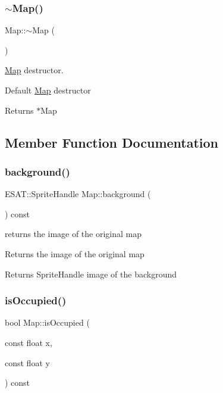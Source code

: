 \subsubsection{\texorpdfstring{$\sim$\+Map()}{~Map()}}
{\footnotesize\ttfamily Map\+::$\sim$\+Map (\begin{DoxyParamCaption}{ }\end{DoxyParamCaption})}



\mbox{\hyperlink{class_map}{Map}} destructor. 

Default \mbox{\hyperlink{class_map}{Map}} destructor

\begin{DoxyReturn}{Returns}
$\ast$\+Map 
\end{DoxyReturn}


\subsection{Member Function Documentation}
\mbox{\label{class_map_ad2be03ca3f10013e1017c0ad4903641b}} 
\subsubsection{\texorpdfstring{background()}{background()}}
{\footnotesize\ttfamily E\+S\+A\+T\+::\+Sprite\+Handle Map\+::background (\begin{DoxyParamCaption}{ }\end{DoxyParamCaption}) const}



returns the image of the original map 

Returns the image of the original map

\begin{DoxyReturn}{Returns}
Sprite\+Handle image of the background 
\end{DoxyReturn}
\mbox{\label{class_map_abc5d67212c69d40198e80f66e29cca7a}} 
\subsubsection{\texorpdfstring{is\+Occupied()}{isOccupied()}}
{\footnotesize\ttfamily bool Map\+::is\+Occupied (\begin{DoxyParamCaption}\item[{const float}]{x,  }\item[{const float}]{y }\end{DoxyParamCaption}) const}



